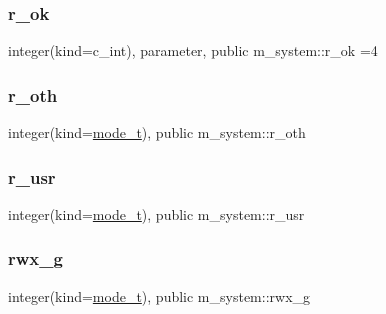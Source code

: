 \subsubsection{\texorpdfstring{r\+\_\+ok}{r\_ok}}
{\footnotesize\ttfamily integer(kind=c\+\_\+int), parameter, public m\+\_\+system\+::r\+\_\+ok =4}

\mbox{\label{namespacem__system_a144868e3f7e98d339ba59eac96a413b7}} 
\subsubsection{\texorpdfstring{r\+\_\+oth}{r\_oth}}
{\footnotesize\ttfamily integer(kind=\mbox{\hyperlink{namespacem__system_abdb5cc27c945379d844db4830d499050}{mode\+\_\+t}}), public m\+\_\+system\+::r\+\_\+oth}

\mbox{\label{namespacem__system_a26b623dd9e8e115960edbb0f252ccf6b}} 
\subsubsection{\texorpdfstring{r\+\_\+usr}{r\_usr}}
{\footnotesize\ttfamily integer(kind=\mbox{\hyperlink{namespacem__system_abdb5cc27c945379d844db4830d499050}{mode\+\_\+t}}), public m\+\_\+system\+::r\+\_\+usr}

\mbox{\label{namespacem__system_a23010fa4addcb4c58b4cb0334a4fdec0}} 
\subsubsection{\texorpdfstring{rwx\+\_\+g}{rwx\_g}}
{\footnotesize\ttfamily integer(kind=\mbox{\hyperlink{namespacem__system_abdb5cc27c945379d844db4830d499050}{mode\+\_\+t}}), public m\+\_\+system\+::rwx\+\_\+g}

\mbox{\label{namespacem__system_a4a602e6ffd2e4b24dc7d80b5e8db3d02}} 
